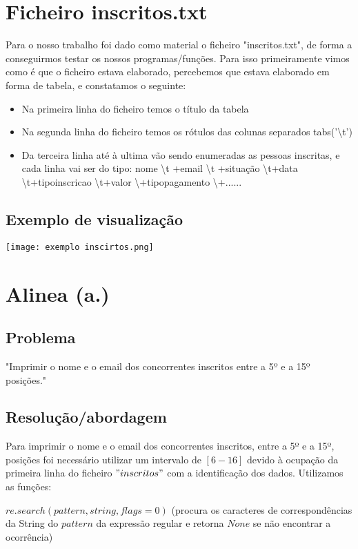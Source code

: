 \documentclass[11pt,a4paper]{report}
\begin{document}
	\section{Ficheiro inscritos.txt}
	Para o nosso trabalho foi dado como material o ficheiro "inscritos.txt", de forma a conseguirmos testar os nossos programas/funções.
	Para isso primeiramente vimos como é que o ficheiro estava elaborado, percebemos que estava elaborado em forma de tabela, e constatamos o seguinte:
	\begin{itemize}
	    \item Na primeira linha do ficheiro temos o título da tabela
	    \item Na segunda linha do ficheiro temos os rótulos das colunas separados tabs('\textbackslash t')
	    \item Da terceira linha até à ultima vão sendo enumeradas as pessoas inscritas, e cada linha vai ser do tipo: nome \textbackslash t +email \textbackslash t +situação \textbackslash t+data \textbackslash t+tipo\textunderscore inscricao \textbackslash t+valor \textbackslash  +tipo\textunderscore pagamento \textbackslash +......
	\end{itemize}
	\subsection{Exemplo de visualização}
	
	\texttt{[image: exemplo inscirtos.png]}
	
\pagebreak

	\section{Alinea (a.)}
	\subsection{Problema}
	"Imprimir o nome e o email dos concorrentes inscritos entre a 5º e a 15º posições."
	
	\subsection{Resolução/abordagem}
	Para imprimir o nome e o email dos concorrentes inscritos, entre a 5º e a 15º, posições foi necessário utilizar um intervalo de $[6 - 16]$ devido à ocupação da primeira linha do ficheiro $"inscritos"$ com a identificação dos dados.
    Utilizamos as funções:

    $re.search(pattern, string, flags=0)$ (procura os caracteres de correspondências da String do $pattern$ da expressão regular e retorna $None$ se não encontrar a ocorrência)
\end{document}

